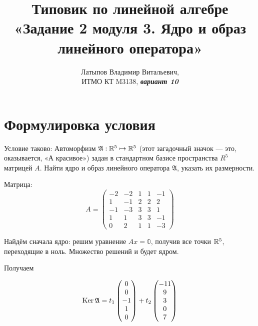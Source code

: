 \documentclass[12pt, a4paper]{article}
\author{Латыпов Владимир Витальевич, \\ ИТМО КТ M3138, \Huge{\textit{\textbf{вариант 10}}}}
\title{Типовик по линейной алгебре «Задание 2 модуля 3. Ядро и образ линейного оператора»}
\begin{document}
    \tit

    \section{Формулировка условия}

    \begin{statement}
        Условие таково: 
        Автоморфизм $\mathfrak{A} : {\mathbb{R}}^5 \mapsto {\mathbb{R}}^5$ (этот загадочный значок — это, оказывается, «А красивое»)
        задан в стандартном базисе 
        пространства $R^5$ матрицей $A$. Найти ядро и образ линейного оператора $\mathfrak{A}$, указать их размерности.
    
        Матрица:
        \begin{equation}
            A = \begin{pmatrix}
                -2 & -2 & 1 & 1 & -1 \\
                1 & -1 & 2 & 2 & 2 \\
                -1 & -3 & 3 & 3 & 1 \\
                1 & 1 & 3 & 3 & -1 \\
                0 & 2 & 1 & 1 & -3
            \end{pmatrix}
        \end{equation}
    \end{statement}

    Найдём сначала ядро: решим уравнение $A x = \mathbb{0}$, получив все точки ${\mathbb{R}}^5$, 
    переходящие в ноль. Множество решений и будет ядром.

    Получаем

    \begin{equation}
        \operatorname{Ker} \mathfrak{A} = t_1 \left(\begin{matrix}
            0 \\
            0 \\
            -1 \\
            1 \\
            0
        \end{matrix}\right) + t_2 \left(\begin{matrix}
            -11 \\
            9 \\
            3 \\
            0 \\
            7
        \end{matrix}\right)
    \end{equation}
\end{document}
